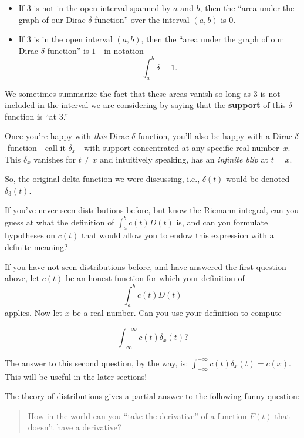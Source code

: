 \documentclass[openany]{book}
\theoremstyle{plain}
\theoremstyle{definition}
\begin{document}
{\begin{itemize}
\item If $3$ is
  not in the open interval spanned by $a$ and $b$, then the ``area
  under the graph of our Dirac $\delta$-function'' over
  the interval $(a,b)$
  is $0$.
\item If $3$ is in the open interval $(a,b)$, then the ``area under the
  graph of our Dirac $\delta$-function'' is $1$---in
  notation $$\int_a^b\delta = 1.$$
\end{itemize}




We sometimes summarize the fact that these areas vanish so long as $3$
is not included in the interval we are considering by saying
that the {\bf support} of this $\delta$-function is ``at $3$.''


Once you're happy with {\it this} Dirac $\delta$-function, you'll also
be happy with a Dirac $\delta$-function---call it $\delta_x$---with
support concentrated at any specific real number~$x$.
This $\delta_x$ vanishes for $t \ne x$ and intuitively speaking, has an
{\it infinite blip} at $t=x$.

So, the original delta-function we were discussing, i.e., $\delta(t)$
would be denoted $\delta_3(t)$.

  If you've never seen distributions
 before, but know the Riemann integral, can you guess at what the
 definition of $\int_a^bc(t)D(t)$ is, and can you formulate hypotheses
 on $c(t)$ that would allow you to endow this expression with a
 definite meaning?


 If you have not seen distributions
before, and have answered the first question above, let
$c(t)$ be an honest function for which your definition
of $$\int_a^bc(t)D(t)$$ applies. Now let $x$ be a real number.
 Can you use your definition to compute

 $$\int_{-{\infty}}^{+{\infty}}c(t)\delta_x(t)?$$

 The answer to this second question, by the way, is:
 $\int_{-{\infty}}^{+{\infty}}c(t)\delta_x(t)=c(x).$ This will be useful in the later sections!


The theory of distributions gives a partial answer to the following funny question:


\begin{quote} How in the world can you ``take the derivative'' of a
  function $F(t)$ that doesn't have a derivative?
\end{quote}

}
\end{document}
